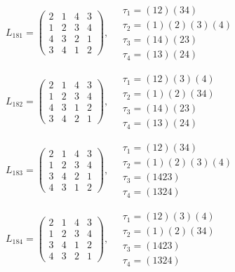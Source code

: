 $L_{181} = \begin{pmatrix} 2 & 1 & 4 & 3 \\ 1 & 2 & 3 & 4 \\ 4 & 3 & 2 & 1 \\ 3 & 4 & 1 & 2 \end{pmatrix}, \quad \begin{matrix} \tau_{1} = (1 2)(3 4) \\ \tau_{2} = (1)(2)(3)(4) \\ \tau_{3} = (1 4)(2 3) \\ \tau_{4} = (1 3)(2 4) \end{matrix}$

$L_{182} = \begin{pmatrix} 2 & 1 & 4 & 3 \\ 1 & 2 & 3 & 4 \\ 4 & 3 & 1 & 2 \\ 3 & 4 & 2 & 1 \end{pmatrix}, \quad \begin{matrix} \tau_{1} = (1 2)(3)(4) \\ \tau_{2} = (1)(2)(3 4) \\ \tau_{3} = (1 4)(2 3) \\ \tau_{4} = (1 3)(2 4) \end{matrix}$

$L_{183} = \begin{pmatrix} 2 & 1 & 4 & 3 \\ 1 & 2 & 3 & 4 \\ 3 & 4 & 2 & 1 \\ 4 & 3 & 1 & 2 \end{pmatrix}, \quad \begin{matrix} \tau_{1} = (1 2)(3 4) \\ \tau_{2} = (1)(2)(3)(4) \\ \tau_{3} = (1 4 2 3) \\ \tau_{4} = (1 3 2 4) \end{matrix}$

$L_{184} = \begin{pmatrix} 2 & 1 & 4 & 3 \\ 1 & 2 & 3 & 4 \\ 3 & 4 & 1 & 2 \\ 4 & 3 & 2 & 1 \end{pmatrix}, \quad \begin{matrix} \tau_{1} = (1 2)(3)(4) \\ \tau_{2} = (1)(2)(3 4) \\ \tau_{3} = (1 4 2 3) \\ \tau_{4} = (1 3 2 4) \end{matrix}$

